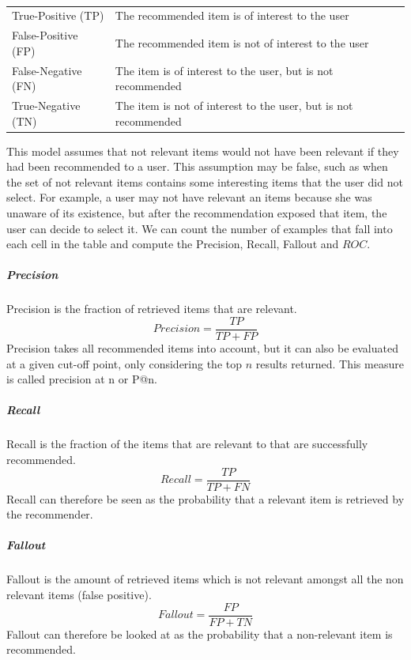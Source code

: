 \begin{table}[H]
	\centering
	\begin{tabular}{l l}
		\toprule
		True-Positive (TP)	& The recommended item is of interest to the user \\
		False-Positive (FP)	& The recommended item is not of interest to the user \\
		False-Negative (FN)	& The item is of interest to the user, but is not recommended \\
		True-Negative (TN)	& The item is not of interest to the user, but is not recommended \\
		\bottomrule
	\end{tabular}
	\label{table:predictionCategories}
	\caption[Prediction Categories]{}
\end{table}

This model assumes that not relevant items would not have been relevant if they had been
recommended to a user. This assumption may be false, such as when the set of
not relevant items contains some interesting items that the user did not select. For
example, a user may not have relevant an items because she was unaware of its
existence, but after the recommendation exposed that item, the user can decide
to select it. We can count the number of examples that fall into each cell in
the table and compute the Precision, Recall, Fallout and $ROC$.

\subparagraph{Precision}
Precision is the fraction of retrieved items that are relevant.
\begin{equation}
    Precision = \frac{TP}{TP+FP}
    \label{equation:precision}
\end{equation}
Precision takes all recommended items into account, but it can also be evaluated at a given cut-off point, only considering the top $n$ results returned. This measure is called precision at n or P@n.

\subparagraph{Recall}
Recall is the fraction of the items that are relevant to that are successfully recommended.
\begin{equation}
    Recall = \frac{TP}{TP+FN}
    \label{equation:recall}
\end{equation}
Recall can therefore be seen as the probability that a relevant item is retrieved by the recommender.

\subparagraph{Fallout}
Fallout is the amount of retrieved items which is not relevant amongst all the non relevant items (false positive).
\begin{equation}
    Fallout = \frac{FP}{FP+TN}
    \label{equation:fallout}
\end{equation}
Fallout can therefore be looked at as the probability that a non-relevant item is recommended.


